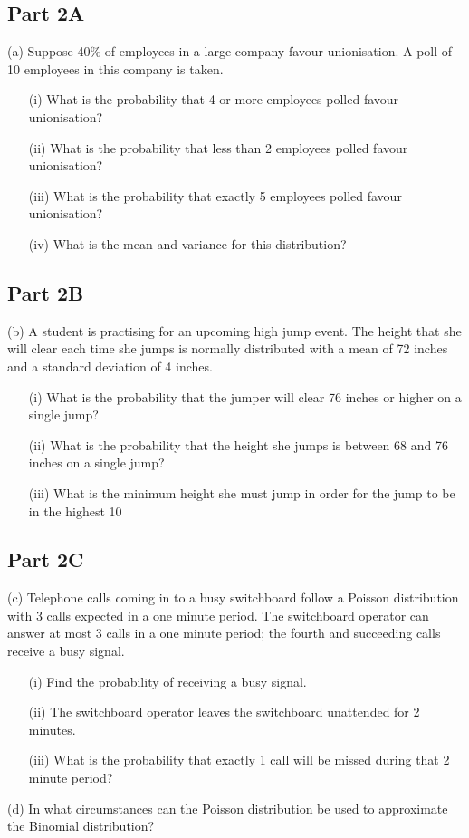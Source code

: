 \subsection*{Part 2A}

(a)	Suppose 40\% of employees in a large company favour unionisation.  A poll of 10 employees in this company is taken.  
 \begin{itemize}
\item[(i)]  	What is the probability that 4 or more employees polled favour unionisation? 
\item[(ii)]  	What is the probability that less than 2 employees polled favour unionisation?
\item[(iii)]  	What is the probability that exactly 5 employees polled favour unionisation?
\item[(iv)]  	What is the mean and variance for this distribution?
\end{itemize}										       

\subsection*{Part 2B}
(b)	A student is practising for an upcoming high jump event.  The height that she will clear each time she jumps is normally distributed with a 
mean of 72 inches and a standard deviation of 4 inches.  
\begin{itemize}
\item[(i)]  	What is the probability that the jumper will clear 76 inches or higher on a single jump?
\item[(ii)]  	What is the probability that the height she jumps is between 68 and 76 inches on a single jump?
\item[(iii)]  	What is the minimum height she must jump in order for the jump to be in the highest 10%
\end{itemize}
    

\subsection*{Part 2C}
(c)	Telephone calls coming in to a busy switchboard follow a Poisson distribution with 3 calls expected in a one minute period.  
The switchboard operator can answer at most 3 calls in a one minute period; the fourth and succeeding calls receive a busy signal.
\begin{itemize} 
\item[(i)]  	   Find the probability of receiving a busy signal.
\item[(ii)]  	   The switchboard operator leaves the switchboard unattended for 2 minutes.  
\item[(iii)]  What is the probability that exactly 1 call will be missed during that 2 minute period?
\end{itemize}       

(d)	In what circumstances can the Poisson distribution be used to approximate the Binomial distribution?
      
